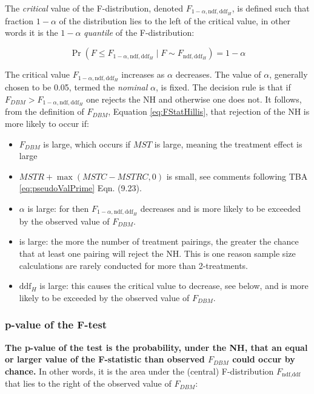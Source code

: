 \documentclass[
]{book}
\providecommand{\tightlist}{%
  \setlength{\itemsep}{0pt}\setlength{\parskip}{0pt}}
\begin{document}
The \emph{critical} value of the F-distribution, denoted \(F_{1-\alpha,\text{ndf},\text{ddf}_H}\), is defined such that fraction \(1-\alpha\) of the distribution lies to the left of the critical value, in other words it is the \(1-\alpha\) \emph{quantile} of the F-distribution:

\begin{equation}
\Pr\left ( F\leq F_{1-\alpha,\text{ndf},\text{ddf}_H} \mid F\sim F_{\text{ndf},\text{ddf}_H}\right ) = 1 - \alpha
\label{eq:critValFStat}
\end{equation}

The critical value \(F_{1-\alpha,\text{ndf},\text{ddf}_H}\) increases as \(\alpha\) decreases. The value of \(\alpha\), generally chosen to be 0.05, termed the \emph{nominal} \(\alpha\), is fixed. The decision rule is that if \(F_{DBM} > F_{1-\alpha, \text{ndf}, \text{ddf}_H}\) one rejects the NH and otherwise one does not. It follows, from the definition of \(F_{DBM}\), Equation \eqref{eq:FStatHillis}, that rejection of the NH is more likely to occur if:

\begin{itemize}
\tightlist
\item
  \(F_{DBM}\) is large, which occurs if \(MST\) is large, meaning the treatment effect is large
\item
  \(MSTR + \max \left (MSTC - MSTRC,0 \right )\) is small, see comments following TBA \eqref{eq:pseudoValPrime} Eqn. (9.23).
\item
  \(\alpha\) is large: for then \(F_{1-\alpha,\text{ndf},\text{ddf}_H}\) decreases and is more likely to be exceeded by the observed value of \(F_{DBM}\).
\item
   is large: the more the number of treatment pairings, the greater the chance that at least one pairing will reject the NH. This is one reason sample size calculations are rarely conducted for more than 2-treatments.
\item
  \(\text{ddf}_H\) is large: this causes the critical value to decrease, see below, and is more likely to be exceeded by the observed value of \(F_{DBM}\).
\end{itemize}

\hypertarget{p-value-of-the-f-test}{%
\subsubsection{p-value of the F-test}\label{p-value-of-the-f-test}}

\textbf{The p-value of the test is the probability, under the NH, that an equal or larger value of the F-statistic than observed \(F_{DBM}\) could occur by chance.} In other words, it is the area under the (central) F-distribution \(F_{\text{ndf},\text{ddf}}\) that lies to the right of the observed value of \(F_{DBM}\):
\end{document}
